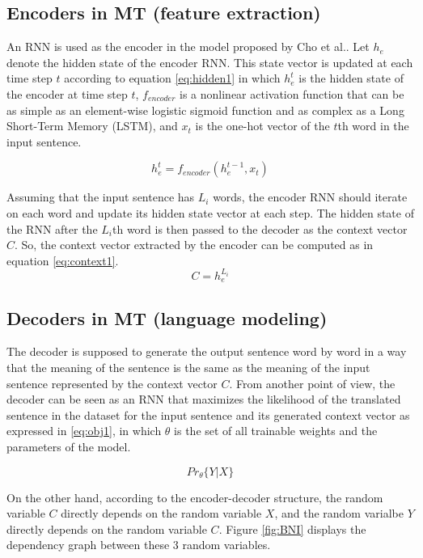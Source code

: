 \documentclass[preprint, 10pt]{elsarticle}
\begin{document}
		\subsection{Encoders in MT (feature extraction)}
		An RNN is used as the encoder in the model proposed by Cho et al.\cite{cho2014learning}. Let $h_e$ denote the hidden state of the encoder RNN. This state vector is updated at each time step $t$ according to equation \eqref{eq:hidden1} in which $h_e^t$ is the hidden state of the encoder at time step $t$, $f_{encoder}$ is a nonlinear activation function that can be as simple as an element-wise logistic sigmoid function and as complex as a Long Short-Term Memory (LSTM), and $x_t$ is the one-hot vector of the $t$th word in the input sentence.
		
		\begin{equation}
			h_e^t = f_{encoder}(h_e^{t-1}, x_t)
			\label{eq:hidden1}
		\end{equation}
		
		Assuming that the input sentence has $L_i$ words, the encoder RNN should iterate on each word and update its hidden state vector at each step. The hidden state of the RNN after the $L_i$th word is then passed to the decoder as the context vector $C$. So, the context vector extracted by the encoder can be computed as in equation \eqref{eq:context1}.
		\begin{equation}
			C = h_e^{L_i}
			\label{eq:context1}
		\end{equation}
		\subsection{Decoders in MT (language modeling)}
		The decoder is supposed to generate the output sentence word by word in a way that the meaning of the sentence is the same as the meaning of the input sentence represented by the context vector $C$. From another point of view, the decoder can be seen as an RNN  that maximizes the likelihood of the translated sentence in the dataset for the input sentence and its generated context vector as expressed in \eqref{eq:obj1}, in which $\theta$ is the set of all trainable weights and the parameters of the model.
		
		\begin{equation}
			Pr_\theta\{Y | X\}
			\label{eq:obj1}
		\end{equation}
		
		On the other hand, according to the encoder-decoder structure, the random variable $C$ directly depends on the random variable $X$, and the random varialbe $Y$ directly depends on the random variable $C$. Figure \ref{fig:BNI} displays the dependency graph between these 3 random variables.
		
\end{document}
